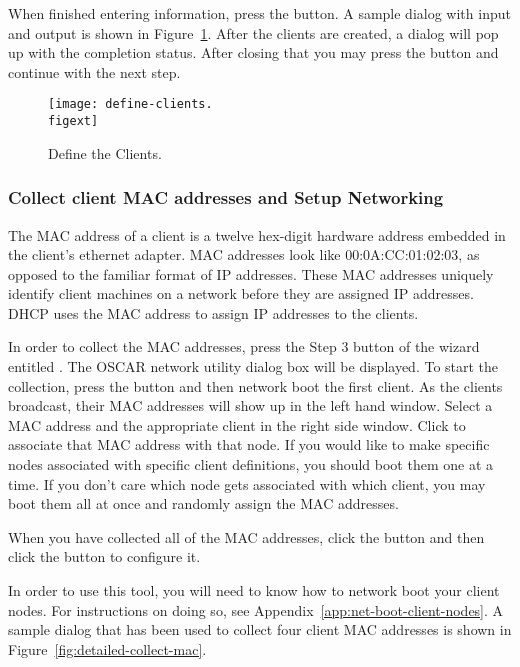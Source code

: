 When finished entering information, press the  button.
A sample dialog with input and output is shown in
Figure~\ref{fig:detailed-define-clients}. After the clients are created,
a dialog will pop up with the completion status. After closing that 
you may press the 
button and continue with the next step.

\begin{figure}[htbp]
  \begin{center}
    \texttt{[image: define-clients.\\figext]}
    \caption{Define the Clients.}
    \label{fig:detailed-define-clients}
  \end{center}
\end{figure}
    
\subsubsection{Collect client MAC addresses and Setup Networking} 

The MAC address of a client
is a twelve hex-digit hardware address embedded in the client's
ethernet adapter. MAC addresses look like 00:0A:CC:01:02:03, as
opposed to the familiar format of IP addresses. These MAC addresses
uniquely identify client machines on a network before they are
assigned IP addresses. DHCP uses the MAC address to assign IP 
addresses to the clients.

In order to collect the MAC addresses,  press the Step 3 button
  of the wizard entitled . The
  OSCAR network utility dialog box will be displayed.
  To start the collection, press the  button and then
  network boot the first client.  As the clients broadcast, their MAC addresses
  will show up in the left hand window. Select a MAC address and the appropriate
  client in the right side window. Click  to 
  associate that MAC address with that node. If you would like to make 
  specific nodes associated with specific client definitions, you should
  boot them one at a time. If you don't care which node gets associated
  with which client, you may boot them all at once and randomly assign
  the MAC addresses.

  When you have collected all of the MAC addresses, click the 
  button and then click the  button to configure it.

  In order to use this tool, you will need to know
  how to network boot your client nodes.  For instructions on doing
  so, see Appendix~\ref{app:net-boot-client-nodes}. A sample dialog
  that has been used to collect four client MAC addresses is shown in
  Figure~\ref{fig:detailed-collect-mac}. 
 
